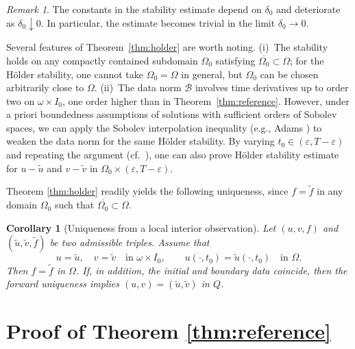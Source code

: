 \documentclass[12pt]{amsart}
\theoremstyle{plain}
\newtheorem{corollary}{Corollary}[section]
\theoremstyle{definition}
\theoremstyle{remark}
\newtheorem{remark}{Remark}[section]
\newcommand{\ooo}{\overline}
\newcommand{\OOO}{\Omega}
\newcommand{\www}{\widetilde}
\newcommand{\Om}{\Omega}
\begin{document}
\begin{remark}\label{rem:holder-features}
The constants in the stability estimate depend on $\delta_0$ and deteriorate as $\delta_0\downarrow0$. In particular, the estimate becomes trivial in the limit $\delta_0 \rightarrow 0$.

Several features of Theorem~\ref{thm:holder} are worth noting.
(i)~The stability holds on any compactly contained subdomain
$\Om_0$ satisfying $\ooo{\OOO_0} \subset\Om$; for the H\"older stability,
one cannot take $\Om_0=\Om$ in general, but $\Om_0$
can be chosen arbitrarily close to $\Om$.
(ii)~The data norm $\mathcal{B}$ involves time derivatives up to order two
on $\omega\times I_0$, one order higher than in
Theorem~\ref{thm:reference}. 
However, under a priori boundedness assumptions
of solutions with sufficient orders of Sobolev spaces, we can apply 
the Sobolev interpolation inequality (e.g., Adams \cite{Adams1975Sobolev})
to weaken the data norm for the 
same H\"older stability.
By varying $t_0\in(\varepsilon,T-\varepsilon)$ and repeating the
argument (cf.\ \cite[Theorem~4.5.1]{Y25}), one can also
prove H\"older stability estimate for $u-\widetilde u$ and $v-\widetilde v$ 
in $\Om_0\times (\varepsilon,T-\varepsilon)$.
\end{remark}

Theorem \ref{thm:holder} readily yields the following uniqueness, since $f = \www f$ in any domain $\OOO_0$ such that $\ooo{\OOO_0} \subset \OOO$.
 
\begin{corollary}[Uniqueness from a local interior observation]\label{cor:unique}
Let $(u,v,f)$ and $(\tilde u,\tilde v,\tilde f)$ be two admissible triples.
Assume that
\[
u=\tilde u,\quad v=\tilde v\quad\text{in }\omega\times I_0,
\qquad
u(\cdot,t_0)=\tilde u(\cdot,t_0)\quad\text{in }\Omega.
\]
Then $f=\tilde f$ in $\Omega$. If, in addition, the initial and boundary data coincide, then the forward uniqueness implies $(u,v)=(\tilde u,\tilde v)$ in $Q$.
\end{corollary}



\section{Proof of Theorem \ref{thm:reference}}
\end{document}
